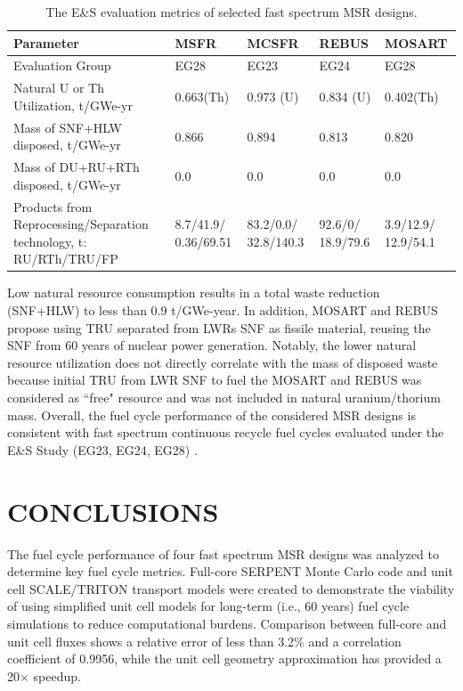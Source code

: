 \documentclass[letterpaper]{mandc2019}
\begin{document}
\begin{table}[t!]
  \vspace{-0.5in}
  \centering
  \caption{The E\&S evaluation metrics of selected fast spectrum \gls{MSR} designs.}
  \label{table:metrics}
  \begin{tabular}{p{} p{} p{} p{} p{}} \toprule
   Parameter &  \gls{MSFR} & \gls{MCSFR} & REBUS & \gls{MOSART} \\ \midrule
   Evaluation Group	&  EG28 & EG23 & EG24 & EG28   \\
   Natural U or Th Utilization, t/GWe-yr & 0.663(Th) & 0.973 (U) & 0.834 (U) & 0.402(Th) \\
   Mass of \gls{SNF}+\gls{HLW} disposed, t/GWe-yr & 0.866 & 0.894 & 0.813 &  0.820 \\
   Mass of DU+RU+RTh disposed, t/GWe-yr & 0.0 & 0.0 & 0.0 &  0.0 \\
   Products from Reprocessing/Separation technology, t: \gls{RU}/\gls{RTh}/\gls{TRU}/\gls{FP} &
   8.7/41.9/ 0.36/69.51 &  83.2/0.0/ 32.8/140.3 & 92.6/0/ 18.9/79.6 & 3.9/12.9/ 12.9/54.1  \\
 \bottomrule
  \end{tabular}
\end{table}

Low natural resource consumption results in a total waste reduction (\gls{SNF}+\gls{HLW}) to less than 0.9 t/GWe-year. %
In addition, \gls{MOSART} and REBUS propose using \gls{TRU} separated from \glspl{LWR} \gls{SNF} as fissile material, reusing the \gls{SNF} from 60 years of nuclear power generation. 
Notably, the lower natural resource utilization does not directly correlate with the mass of disposed waste because initial TRU from \gls{LWR} \gls{SNF} to fuel the \gls{MOSART} and REBUS was considered as ``free" resource and was not included in natural uranium/thorium mass. 
Overall, the fuel cycle performance of the considered \gls{MSR} designs is consistent with fast spectrum continuous recycle fuel cycles evaluated under the E\&S Study (EG23, EG24, EG28)  \cite{wigeland_nuclear_2014-4}. %
\section{CONCLUSIONS}
The fuel cycle performance of four fast spectrum \gls{MSR} designs was analyzed to determine key fuel cycle metrics. 
Full-core SERPENT Monte Carlo code and unit cell SCALE/TRITON transport models were created to demonstrate the viability of using simplified unit cell models for long-term (i.e., 60 years) fuel cycle simulations to reduce computational burdens. 
Comparison between full-core and unit cell fluxes shows a relative error of less than 3.2\% and a correlation coefficient of 0.9956, while the unit cell geometry approximation has provided a 20$\times$ speedup.
\end{document}
